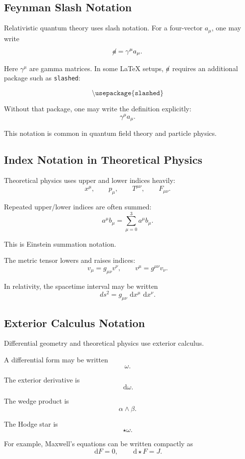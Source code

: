 \documentclass[11pt,twocolumn]{article}
\providecommand{\slashed}[1]{\cancel{#1}}
\newcommand{\dd}{\,\mathrm{d}}
\begin{document}
\subsection{Feynman Slash Notation}

Relativistic quantum theory uses slash notation. For a four-vector \(a_\mu\),
one may write
\[
\slashed{a}
=
\gamma^\mu a_\mu.
\]

Here \(\gamma^\mu\) are gamma matrices. In some LaTeX setups,
\(\slashed{a}\) requires an additional package such as \texttt{slashed}:

\[
\texttt{\textbackslash usepackage\{slashed\}}
\]

Without that package, one may write the definition explicitly:
\[
\gamma^\mu a_\mu.
\]

This notation is common in quantum field theory and particle physics.

\subsection{Index Notation in Theoretical Physics}

Theoretical physics uses upper and lower indices heavily:
\[
x^\mu,
\qquad
p_\mu,
\qquad
T^{\mu\nu},
\qquad
F_{\mu\nu}.
\]

Repeated upper/lower indices are often summed:
\[
a^\mu b_\mu
=
\sum_{\mu=0}^{3} a^\mu b_\mu.
\]

This is Einstein summation notation.

The metric tensor lowers and raises indices:
\[
v_\mu
=
g_{\mu\nu}v^\nu,
\qquad
v^\mu
=
g^{\mu\nu}v_\nu.
\]

In relativity, the spacetime interval may be written
\[
ds^2
=
g_{\mu\nu}\,\dd x^\mu\,\dd x^\nu.
\]

\subsection{Exterior Calculus Notation}

Differential geometry and theoretical physics use exterior calculus.

A differential form may be written
\[
\omega.
\]

The exterior derivative is
\[
\dd\omega.
\]

The wedge product is
\[
\alpha\wedge\beta.
\]

The Hodge star is
\[
\star\omega.
\]

For example, Maxwell's equations can be written compactly as
\[
\dd F = 0,
\qquad
\dd \star F = J.
\]
\end{document}
